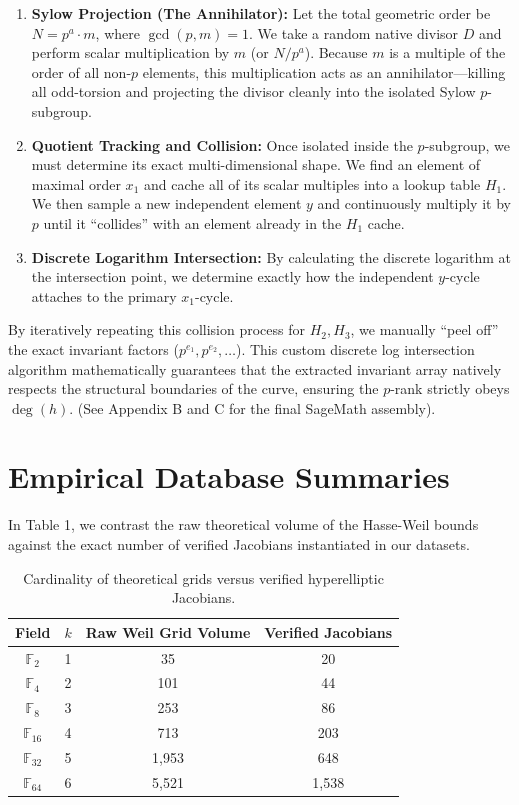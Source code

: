 \documentclass[letterpaper, 11pt]{article}
\begin{document}
\begin{enumerate}
    \item \textbf{Sylow Projection (The Annihilator):} Let the total geometric order be $N = p^a \cdot m$, where $\gcd(p,m)=1$. We take a random native divisor $D$ and perform scalar multiplication by $m$ (or $N/p^a$). Because $m$ is a multiple of the order of all non-$p$ elements, this multiplication acts as an annihilator—killing all odd-torsion and projecting the divisor cleanly into the isolated Sylow $p$-subgroup.
    \item \textbf{Quotient Tracking and Collision:} Once isolated inside the $p$-subgroup, we must determine its exact multi-dimensional shape. We find an element of maximal order $x_1$ and cache all of its scalar multiples into a lookup table $H_1$. We then sample a new independent element $y$ and continuously multiply it by $p$ until it ``collides'' with an element already in the $H_1$ cache. 
    \item \textbf{Discrete Logarithm Intersection:} By calculating the discrete logarithm at the intersection point, we determine exactly how the independent $y$-cycle attaches to the primary $x_1$-cycle.
\end{enumerate}

By iteratively repeating this collision process for $H_2, H_3$, we manually ``peel off'' the exact invariant factors ($p^{e_1}, p^{e_2}, \dots$). This custom discrete log intersection algorithm mathematically guarantees that the extracted invariant array natively respects the structural boundaries of the curve, ensuring the $p$-rank strictly obeys $\deg(h)$. (See Appendix B and C for the final SageMath assembly).

\section{Empirical Database Summaries}
In Table 1, we contrast the raw theoretical volume of the Hasse-Weil bounds against the exact number of verified Jacobians instantiated in our datasets.

\begin{table}[h!]
\centering
\begin{tabular}{cccc}
\toprule
Field & $k$ & Raw Weil Grid Volume & Verified Jacobians \\
\midrule
$\mathbb{F}_2$ & 1 & 35 & 20 \\
$\mathbb{F}_4$ & 2 & 101 & 44 \\
$\mathbb{F}_8$ & 3 & 253 & 86 \\
$\mathbb{F}_{16}$ & 4 & 713 & 203 \\
$\mathbb{F}_{32}$ & 5 & 1,953 & 648 \\
$\mathbb{F}_{64}$ & 6 & 5,521 & 1,538 \\
\bottomrule
\end{tabular}
\caption{Cardinality of theoretical grids versus verified hyperelliptic Jacobians.}
\end{table}
\end{document}
